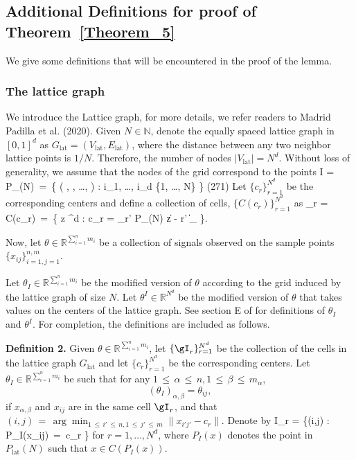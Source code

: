 \documentclass[twoside,11pt]{article}
\begin{document}
\subsection{Additional Definitions for proof of Theorem~\ref{Theorem_5}}
We give some definitions that will be encountered in the proof of the lemma.  

\subsubsection{The lattice graph}
\label{knn_notation}
We introduce the Lattice graph, for more details, we refer readers to Madrid Padilla et al. (2020).
Given \( N \in \mathbb{N} \), denote the equally spaced lattice graph in \( [0,1]^d \) as \( G_\text{lat} = (V_\text{lat}, E_\text{lat}) \), where the distance between any two neighbor lattice points is \( 1/N \). Therefore, the number of nodes \( |V_\text{lat}| = N^d \). Without loss of generality, we assume that the nodes of the grid correspond to the points
\beq 
\label{lat_g}
I = P_(N) \,=\, \left\{ \left( , , \ldots,  \right) : i_1, \ldots, i_d \in \{1, \ldots, N\} \right\} \quad (271)
\beq 
Let \( \{c_r\}_{r=1}^{N^d} \) be the corresponding centers and define a collection of cells, \( \{C(c_r)\}_{r=1}^{N^d} \) as
\beq 
\label{knn_center}
\gI_r = C(c_r) \,=\, \left\{ z \in [0,1]^d : c_r = \arg\min_{r' \in P_(N)} \| z - r' \|_{\infty} \right\}.
\beq 

Now, let \( \theta \in \mathbb{R}^{\sum_{i=1}^n m_i} \) be a collection of signals observed on the sample points \( \{x_{ij}\}_{i=1,j=1}^{n,m} \). 


Let \( \theta_I \in \mathbb{R}^{\sum_{i=1}^n m_i} \) be the modified version of \( \theta \) according to the grid induced by the lattice graph of size \( N \). Let \( \theta^I \in \mathbb{R}^{N^d} \) be the modified version of \( \theta \) that takes values on the centers of the lattice graph. See section E of \cite{madrid2020adaptive} for definitions of \( \theta_I \) and \( \theta^I \). For completion, the definitions are included as follows.

\textbf{Definition 2.} Given \( \theta \in \mathbb{R}^{\sum_{i=1}^n m_i} \), let \( \{\gI_r\}_{r=1}^{N^d} \) be the collection of the cells in the lattice graph \( G_\text{lat} \) and let \( \{c_r\}_{r=1}^{N^d} \) be the corresponding centers. Let \( \theta_I \in \mathbb{R}^{\sum_{i=1}^n m_i} \) be such that for any \( 1 \,\leq\, \alpha \,\leq\, n, 1 \,\leq\, \beta \,\leq\, m_{\alpha} \),
\[
(\theta_I)_{\alpha,\beta} = \theta_{ij},
\]
if \( x_{\alpha,\beta} \) and \( x_{ij} \) are in the same cell \( \gI_r \), and that \( (i,j) \,=\, \arg\min_{1 \,\leq\, i' \,\leq\, n,1 \,\leq\, j' \,\leq\, m} \|x_{i'j'} - c_r\| \). 
Denote by 
\beq \label{I_r} I_r = \{(i,j) \in [n] \times [m] : P_I(x_{ij}) \,=\, c_r \} \beq  for \( r = 1, \ldots, N^d \), where \( P_I(x) \) denotes the point in \( P_\text{lat}(N) \) such that \( x \in C(P_I(x)) \).
\end{document}
